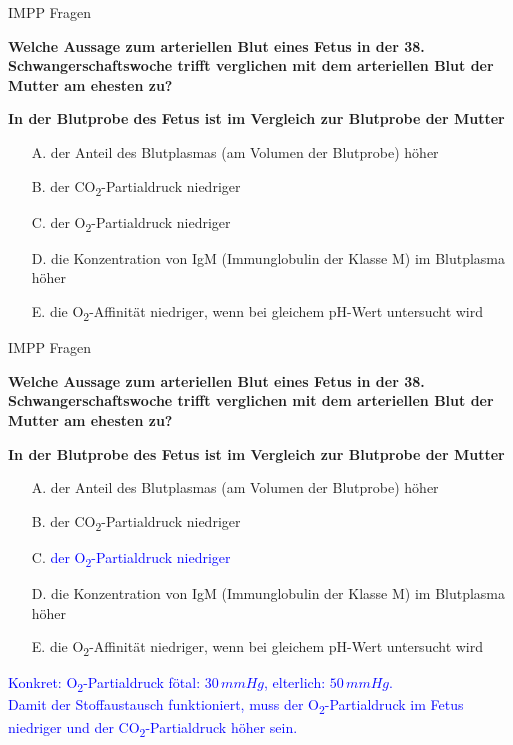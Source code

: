\documentclass{beamer}
\begin{document}
\begin{frame}{IMPP Fragen}

\textbf{Welche Aussage zum arteriellen Blut eines Fetus in der 38. Schwangerschaftswoche trifft verglichen mit dem arteriellen Blut der Mutter am ehesten zu? }

\textbf{
In der Blutprobe des Fetus ist im Vergleich zur Blutprobe der Mutter
}\\[0.2 cm]

\begin{itemize}
\item[A.] der Anteil des Blutplasmas (am Volumen der Blutprobe) höher
\item[B.] der CO\textsubscript{2}-Partialdruck niedriger
\item[C.] der O\textsubscript{2}-Partialdruck niedriger %
\item[D.] die Konzentration von IgM (Immunglobulin der Klasse M) im Blutplasma höher
\item[E.] die O\textsubscript{2}-Affinität niedriger, wenn bei gleichem pH-Wert untersucht wird 

\end{itemize}

    
\end{frame}


\begin{frame}{IMPP Fragen}

\textbf{Welche Aussage zum arteriellen Blut eines Fetus in der 38. Schwangerschaftswoche trifft verglichen mit dem arteriellen Blut der Mutter am ehesten zu? }

\textbf{
In der Blutprobe des Fetus ist im Vergleich zur Blutprobe der Mutter
}\\[0.2 cm]

\begin{itemize}
\item[A.] der Anteil des Blutplasmas (am Volumen der Blutprobe) höher
\item[B.] der CO\textsubscript{2}-Partialdruck niedriger
\item[C.] \textcolor{blue}{der O\textsubscript{2}-Partialdruck niedriger} %
\item[D.] die Konzentration von IgM (Immunglobulin der Klasse M) im Blutplasma höher
\item[E.] die O\textsubscript{2}-Affinität niedriger, wenn bei gleichem pH-Wert untersucht wird 

\end{itemize}

\textcolor{blue}{Konkret:  O\textsubscript{2}-Partialdruck fötal: \(30\,mmHg\), elterlich: \(50\,mmHg\). \\ 
Damit der Stoffaustausch funktioniert, muss der  O\textsubscript{2}-Partialdruck im Fetus niedriger und der CO\textsubscript{2}-Partialdruck höher sein. 
    }
    
\end{frame}
\end{document}
